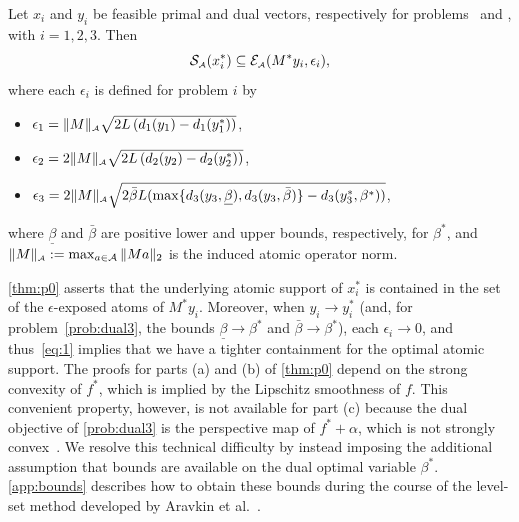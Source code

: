 \begin{theorem}\label{thm:p0}
  Let $x_i$ and $y_i$ be feasible primal and dual vectors, respectively for
  problems \Probi\ and \Drobi, with $i = 1, 2, 3$. Then
  \begin{equation}\label{eq:1} 
    \operatorname{\mathcal{S}_{\scriptscriptstyle\mathcal{A}}}(x_i^*) \subseteq \mathcal{E}_{\scriptscriptstyle\mathcal{A}}(M^*y_i, \epsilon_i),
  \end{equation}
  where each $\epsilon_i$ is defined for problem $i$ by
  \begin{itemize} \setlength\itemsep{-0.0em}
  \item \label{thm:p1} $\epsilon_1 = \|M\|_{\scriptscriptstyle\mathcal{A}}\sqrt{2L \left( d_1(y_1) - d_1(y_1^*) \right)}$,

  \item \label{thm:p2} $\epsilon_2 = 2\|M\|_{\scriptscriptstyle\mathcal{A}}\sqrt{2L \left( d_2(y_2) - d_2(y_2^*) \right)}$,
    
  \item \label{thm:p3} $\epsilon_3 = 2\|M\|_{\scriptscriptstyle\mathcal{A}}\sqrt{2\bar{\beta}L (
        \max\{d_3(y_3, \underline{\beta}), d_3(y_3, \bar{\beta})\} - d_3( y_3^*, \beta^*) ) }$, 
  \end{itemize}
  where $\underline{\beta}$ and $\bar{\beta}$ are positive lower and
  upper bounds, respectively, for $\beta^*$, and $\|M\|_{\scriptscriptstyle\mathcal{A}}:=\max_{a\in\mathcal{A}}\|Ma\|_2$ is the induced atomic operator norm.
\end{theorem}

\autoref{thm:p0} asserts that the underlying atomic support of $x_i^*$ is contained in the set of the $\epsilon$-exposed atoms of $M^* y_i$.  Moreover, when $y_i\to y_i^*$ (and, for problem~\eqref{prob:dual3}, the bounds $\underline\beta\to\beta^*$ and $\bar\beta\to\beta^*$), each $\epsilon_i\to0$, and thus~\eqref{eq:1} implies that we have a tighter containment for the optimal atomic support.  The proofs for parts (a) and (b) of \autoref{thm:p0} depend on the strong convexity of $f^*$, which is implied by the Lipschitz smoothness of $f$. This convenient property, however, is not available for part (c) because the dual objective of \eqref{prob:dual3} is the perspective map of $f^* + \alpha$, which is not strongly convex~\cite{aravkin2018foundations}. We resolve this technical difficulty by instead imposing the additional assumption that bounds are available on the dual optimal variable $\beta^*$. \autoref{app:bounds} describes how to obtain these bounds during the course of the level-set method developed by Aravkin et al.~\cite{aravkin2016levelset}. 


